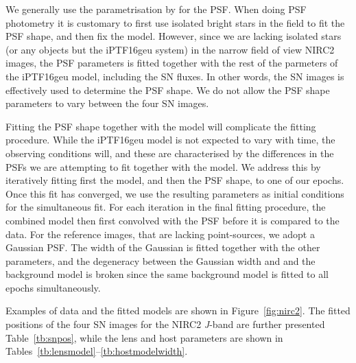 \documentclass[a4paper,fleqn,usenatbib]{mnras}
\newcommand{\geu}{iPTF16geu\xspace}
\newcommand{\sn}{SN\xspace}
\newcommand{\jband}{{\it J}\xspace}
\begin{document}
We generally use the parametrisation by \citet{1969A&A.....3..455M} for the PSF.  When doing PSF photometry it is customary 
to first use isolated bright stars in the field to fit the PSF shape, and then fix the model.  However, since we are lacking 
isolated stars (or any objects but the \geu system) in the narrow field of view NIRC2 images, the PSF parameters is fitted 
together with the rest of the parmeters of the \geu model, including the \sn fluxes.  In other words, the \sn images is effectively 
used to determine the PSF shape.  We do not allow the PSF shape parameters to vary between the four \sn images.

Fitting the PSF shape together with the model will complicate the fitting procedure.  While the \geu model is not expected to vary with
time, the observing conditions will, and these are characterised by the differences in the PSFs we are attempting to fit together 
with the model.  We address this by iteratively fitting first the model, and then the PSF shape, to one of our epochs.  Once this fit has
converged, we use the resulting parameters as initial conditions for the simultaneous fit.  For each iteration in the final 
fitting procedure, the combined model then first convolved with the PSF before it is compared to the data.   For the reference 
images, that are lacking point-sources, we adopt a Gaussian PSF.  The width of the Gaussian is fitted together with the 
other parameters, and the degeneracy between the Gaussian width and and the background model is broken since the same 
background model is fitted to all epochs simultaneously. 

Examples of data and the fitted models are shown in Figure~\ref{fig:nirc2}.  The fitted positions of the four \sn
images for the NIRC2 \jband-band are further presented Table~\ref{tb:snpos}, while the lens and host parameters are shown 
in Tables~\ref{tb:lensmodel}--\ref{tb:hostmodelwidth}. 
\end{document}
